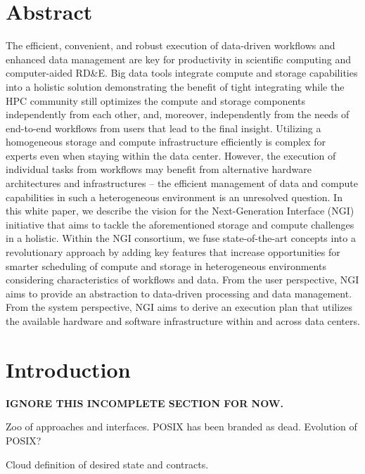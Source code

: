 \documentclass[a4paper, twocolumn]{article}
\title{\papertitle}
\author{Julian M. Kunkel \\
  \textit{University of Reading}
	\and
  A
  \and
  B
  \and
  C
}
\date{\today}
\begin{document}
\maketitle
\thispagestyle{fancy}

\section*{Abstract}

The efficient, convenient, and robust execution of data-driven workflows and enhanced data management are key for productivity in scientific computing and computer-aided RD\&E.
Big data tools integrate compute and storage capabilities into a holistic solution demonstrating the benefit of tight integrating while the HPC community still optimizes the compute and storage components independently from each other, and, moreover, independently from the needs of end-to-end workflows from users that lead to the final insight.
Utilizing a homogeneous storage and compute infrastructure efficiently is complex for experts even when staying within the data center.
However, the execution of individual tasks from workflows may benefit from alternative hardware architectures and infrastructures -- the efficient management of data and compute capabilities in such a heterogeneous environment is an unresolved question.
In this white paper, we describe the vision for the Next-Generation Interface (NGI) initiative that aims to tackle the aforementioned storage and compute challenges in a holistic.
Within the NGI consortium, we fuse state-of-the-art concepts into a revolutionary approach by adding key features that increase opportunities for smarter scheduling of compute and storage in heterogeneous environments considering characteristics of workflows and data.
From the user perspective, NGI aims to provide an abstraction to data-driven processing and data management.
From the system perspective, NGI aims to derive an execution plan that utilizes the available hardware and software infrastructure within and across data centers.

\section{Introduction}

\textbf{IGNORE THIS INCOMPLETE SECTION FOR NOW.}

Zoo of approaches and interfaces.
POSIX has been branded as dead.
Evolution of POSIX?

Cloud definition of desired state and contracts.
\end{document}
